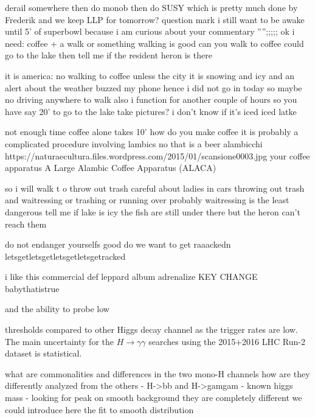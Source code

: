 derail somewhere then do monob then do SUSY which is pretty much done by Frederik and we keep LLP for tomorrow?
question 
mark
i still want to be awake until 5' of superbowl because i am curious about your commentary
'''';;;;; ok
i need: coffee + a walk or something
walking is good
can you walk to coffee 
 could go to the lake
 then tell me if the resident heron is there

it is america: no walking to coffee unless the city
it is snowing and icy and an alert about the weather buzzed my phone
hence i did not go in today
so maybe no driving anywhere to walk
also i function for another couple of hours 
so you have say 20' to go to the lake
take pictures?
i don't know if it's iced
iced latke


not enough time
coffee alone takes 10'
how do you make coffee
it is probably a complicated procedure
involving lambics
no that is a beer
alambicchi
https://naturaecultura.files.wordpress.com/2015/01/scansione0003.jpg
your coffee apparatus
A Large Alambic Coffee Apparatus (ALACA)

so i will walk t
o throw out trash
careful about ladies in cars throwing out trash and waitressing or trashing or running over 
probably waitressing is the least dangerous
tell me if lake is icy
the fish are still under there but the heron can't reach them

do not endanger yourselfs
good
do we want to get raaackedn
letsgetletsgetletsgetletsgetracked



i like this commercial def leppard album
adrenalize
KEY CHANGE
babythatistrue



and the ability to probe low \MET 



thresholds compared to other Higgs decay channel as the trigger rates are low. 
The main uncertainty for the $H \rightarrow \gamma\gamma$ searches using the 2015+2016
LHC Run-2 dataset is statistical. 



what are commonalities and differences in the two mono-H channels
how are they differently analyzed from the others
- H->bb and H->gamgam
- known higgs mass
- looking for peak on smooth background
they are completely different 
we could introduce here the fit to smooth distribution

